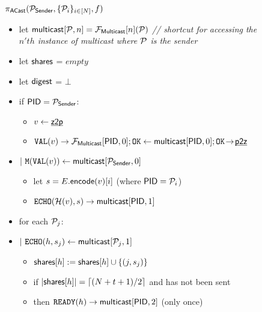 \begin{figure}[h!]
  \begin{boxedminipage}{\columnwidth}
    \begin{centering}
      \textbf{$\proto{ACast}(\P_{\msf{Sender}}, {\Ps},f)$} \\
    \end{centering}
    \small
    \begin{itemize}[leftmargin=2mm]
    \item[] let $\msf{multicast}[\P,n] = \F{Multicast}[n](\P)$ \emph{// shortcut for accessing the $n'th$ instance of multicast where $\P$ is the sender}
    \item[] let $\msf{shares}$ =  $empty$
    \item[] let $\msf{digest}$ =  $\bot$
    \item[] if $\msf{PID} = \P_{\msf{Sender}}$:
      \begin{itemize}[leftmargin=2mm]
      \item[] $v \leftarrow \chan{z2p}$
      \item[] $\mtt{VAL}(v) \rightarrow \F{Multicast}[\msf{PID},0]; \mtt{OK} \leftarrow \msf{multicast}[\msf{PID},0]; \mtt{OK}\!\rightarrow\!\chan{p2z}$
      \end{itemize}
    \item[] $|~ \mtt{M}(\mtt{VAL}(v)) \leftarrow \msf{multicast}[\P_\msf{Sender},0]$
      \begin{itemize}[leftmargin=2mm]
      \item[] let $s = E.\msf{encode}(v)[i]$ (where $\msf{PID} = \P_i$)
      \item[] $\mtt{ECHO}(\hash(v),s) \rightarrow \msf{multicast}[\msf{PID}, 1]$
      \end{itemize}
    \item[] for each $\P_j$:
    \item[] $|~ \mtt{ECHO}(h,s_j) \leftarrow \msf{multicast}[\P_j, 1]$
      \begin{itemize}[leftmargin=2mm]
      \item[] $\msf{shares}[h] := \msf{shares}[h] \cup \{(j,s_j)\}$
      \item[] if $|\msf{shares}[h]| = \lceil (N+t+1) / 2 \rceil$ and  has not been sent 
      \item[] then $\mtt{READY}(h) \rightarrow \msf{multicast}[\msf{PID}, 2]$ (only once)

\end{itemize}
\end{itemize}
\end{boxedminipage}
\end{figure}
